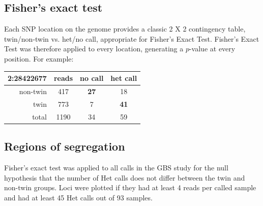 \documentclass[maize,portrait]{a0poster}
\begin{document}
\begin{multicols}{3}
  \subsection*{Fisher's exact test}

  Each SNP location on the genome provides a classic 2 X 2 contingency table, twin/non-twin vs. het/no call, appropriate for Fisher's Exact Test. Fisher's Exact Test was therefore applied to
  every location, generating a $p$-value at every position. For example:

  \begin{center}
    \begin{tabular}{|r|c|c|c|}
      \hline
      \textbf{2:28422677} & reads & no call & het call \\
      \hline
      non-twin   & 417   & \textbf{27} & 18 \\
      \hline
      twin       & 773   & 7  & \textbf{41} \\
      \hline
      total      & 1190  & 34 & 59 \\
      \hline
    \end{tabular}
  \end{center}


  \subsection*{Regions of segregation}

  Fisher's exact test was applied to all calls in the GBS study for the null hypothesis that the number of Het calls does not differ between the twin and non-twin groups.
  Loci were plotted if they had at least 4 reads per called sample and had at least 45 Het calls out of 93 samples.
  

\end{multicols}
\end{document}
